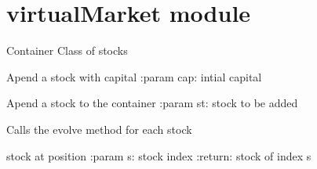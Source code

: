 \documentclass[letterpaper,10pt,english]{sphinxmanual}
\begin{document}
\chapter{virtualMarket module}
\label{virtualMarket:module-virtualMarket}\label{virtualMarket::doc}\label{virtualMarket:virtualmarket-module}

\begin{fulllineitems}
\label{virtualMarket:virtualMarket.virtualMarket}
Container Class of stocks

\begin{fulllineitems}
\label{virtualMarket:virtualMarket.virtualMarket.AddStock}
Apend a stock with capital
:param cap: intial capital

\end{fulllineitems}


\begin{fulllineitems}
\label{virtualMarket:virtualMarket.virtualMarket.AddStockC}
Apend a stock to the container
:param st: stock to be added

\end{fulllineitems}


\begin{fulllineitems}
\label{virtualMarket:virtualMarket.virtualMarket.Evolve}
Calls the evolve method for each stock

\end{fulllineitems}


\begin{fulllineitems}
\label{virtualMarket:virtualMarket.virtualMarket.getStock}
stock at position
:param s: stock index
:return: stock of index s

\end{fulllineitems}


\end{fulllineitems}
\end{document}
